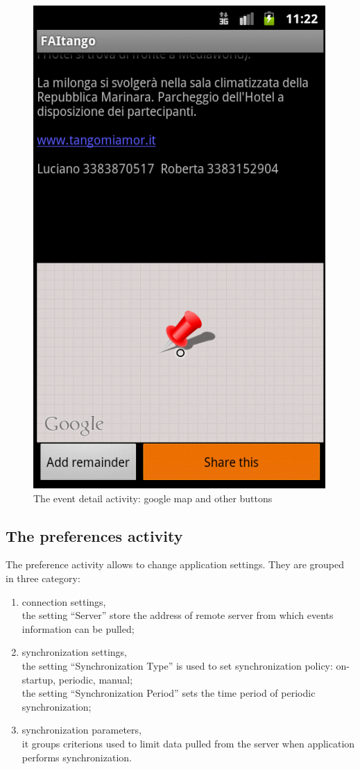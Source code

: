 \documentclass[12pt, twoside]{article}
\begin{document}
\begin{figure}[h]
\begin{center}
\includegraphics[scale=0.60]{fig/event-detail-down.png}
\end{center}
\caption{The event detail activity: google map and other buttons}
\label{fig:eventdetaildown}
\end{figure}

\subsection{The preferences activity}

The preference activity allows to change application settings. They are grouped in three category:
\begin{enumerate}
	\item	connection settings,\\
		the setting ``Server'' store the address of remote server from which events information can be pulled;
	\item synchronization settings,\\
		the setting ``Synchronization Type'' is used to set synchronization policy: on-startup, periodic, manual;\\
		the setting ``Synchronization Period'' sets the time period of periodic synchronization;
	\item synchronization parameters,\\
		it groups criterions used to limit data pulled from the server when application performs synchronization.
\end{enumerate}
\end{document}
